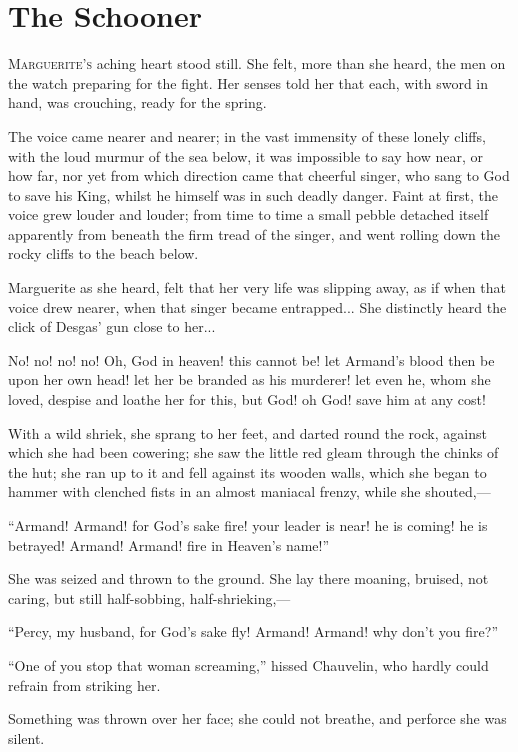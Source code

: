 
\chapter{The Schooner}
\lettrine[lines=4]{M}{arguerite's} aching heart stood still. She felt, more than she heard, the men on the watch preparing for the fight. Her senses told her that each, with sword in hand, was crouching, ready for the spring.

The voice came nearer and nearer; in the vast immensity of these lonely cliffs, with the loud murmur of the sea below, it was impossible to say how near, or how far, nor yet from which direction came that cheerful singer, who sang to God to save his King, whilst he himself was in such deadly danger. Faint at first, the voice grew louder and louder; from time to time a small pebble detached itself apparently from beneath the firm tread of the singer, and went rolling down the rocky cliffs to the beach below.

Marguerite as she heard, felt that her very life was slipping away, as if when that voice drew nearer, when that singer became entrapped... She distinctly heard the click of Desgas’ gun close to her...

No! no! no! no! Oh, God in heaven! this cannot be! let Armand's blood then be upon her own head! let her be branded as his murderer! let even he, whom she loved, despise and loathe her for this, but God! oh God! save him at any cost!

With a wild shriek, she sprang to her feet, and darted round the rock, against which she had been cowering; she saw the little red gleam through the chinks of the hut; she ran up to it and fell against its wooden walls, which she began to hammer with clenched fists in an almost maniacal frenzy, while she shouted,---

\enquote{Armand! Armand! for God's sake fire! your leader is near! he is coming! he is betrayed! Armand! Armand! fire in Heaven's name!}

She was seized and thrown to the ground. She lay there moaning, bruised, not caring, but still half-sobbing, half-shrieking,---

\enquote{Percy, my husband, for God's sake fly! Armand! Armand! why don't you fire?}

\enquote{One of you stop that woman screaming,} hissed Chauvelin, who hardly could refrain from striking her.

Something was thrown over her face; she could not breathe, and perforce she was silent.

